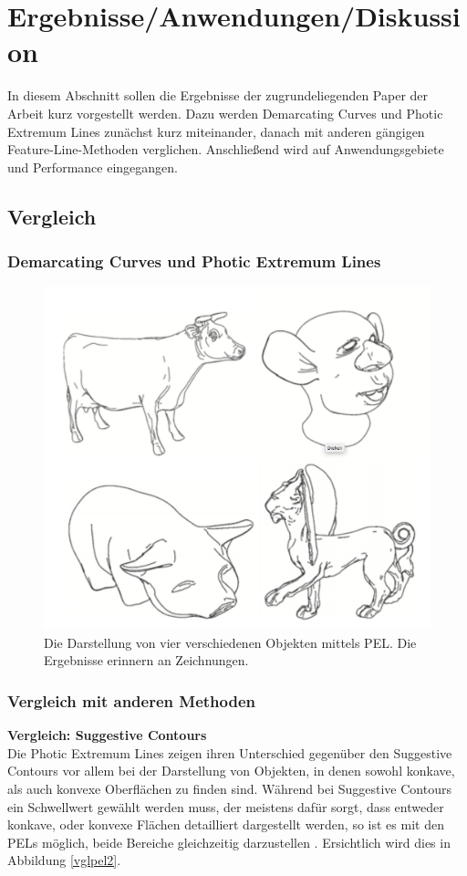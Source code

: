 \documentclass{paperStyle}
\begin{document}
\section{Ergebnisse/Anwendungen/Diskussion}
In diesem Abschnitt sollen die Ergebnisse der zugrundeliegenden Paper der Arbeit kurz vorgestellt werden. Dazu werden Demarcating Curves und Photic Extremum Lines zunächst kurz miteinander, danach mit anderen gängigen Feature-Line-Methoden verglichen. Anschließend wird auf Anwendungsgebiete und Performance eingegangen. 
\subsection{Vergleich}
\subsubsection{Demarcating Curves und Photic Extremum Lines}
\begin{figure}
	\centering
		\includegraphics[width=0.9\linewidth]{resultspel.png}
	\caption{Die Darstellung von vier verschiedenen Objekten mittels PEL. Die Ergebnisse erinnern an Zeichnungen.\cite{Xie2007}}
	\label{anwpel}
\end{figure}
\subsubsection{Vergleich mit anderen Methoden}
\textbf{Vergleich: Suggestive Contours}\\
Die Photic Extremum Lines zeigen ihren Unterschied gegenüber den Suggestive Contours vor allem bei der Darstellung von Objekten, in denen sowohl konkave, als auch konvexe Oberflächen zu finden sind. Während bei Suggestive Contours ein Schwellwert gewählt werden muss, der meistens dafür sorgt, dass entweder konkave, oder konvexe Flächen detailliert dargestellt werden, so ist es mit den PELs möglich, beide Bereiche gleichzeitig darzustellen \cite{Xie2007}. Ersichtlich wird dies in Abbildung \ref{vglpel2}.
\end{document}
